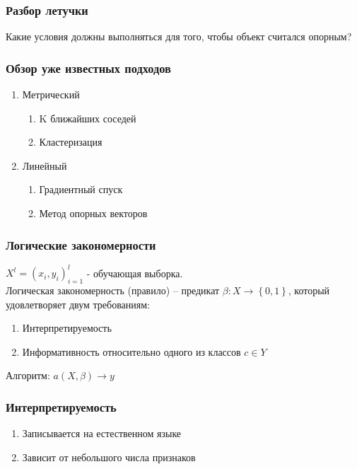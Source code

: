 \documentclass[12pt]{beamer}
\subtitle{Лекция 8. Логические алгоритмы классификации.}
\begin{document}
	
\frame{\titlepage}

\begin{frame}\frametitle{Разбор летучки}
Какие условия должны выполняться для того, чтобы объект считался опорным?
\end{frame}

\begin{frame}\frametitle{Обзор уже известных подходов}
\begin{enumerate} 
	\item Метрический
		\begin{enumerate} [--]
			\item K ближайших соседей
			\item Кластеризация 
		\end{enumerate}
	\item Линейный
		\begin{enumerate} [--]
			\item Градиентный спуск
			\item Метод опорных векторов
		\end{enumerate}
\end{enumerate}
\end{frame}

\begin{frame}\frametitle{Логические закономерности}
${X^l = \left( x_i, y_i \right)_{i=1}^l}$ - обучающая выборка.\\
\vspace{5mm}
Логическая закономерность (правило) -- предикат ${\beta: X \rightarrow \left\{ 0, 1 \right\} }$, который удовлетворяет двум требованиям:\\
\begin{enumerate} [-]
	\item Интерпретируемость
	\item Информативность относительно одного из классов ${c \in Y}$
\end{enumerate}
\vspace{5mm}
Алгоритм: $a(X, \beta) \rightarrow y$
\end{frame}


\begin{frame}\frametitle{Интерпретируемость}
	\begin{enumerate} [-]
		\item Записывается на естественном языке
		\item Зависит от небольшого числа признаков
	\end{enumerate}
\end{frame}
\end{document}
